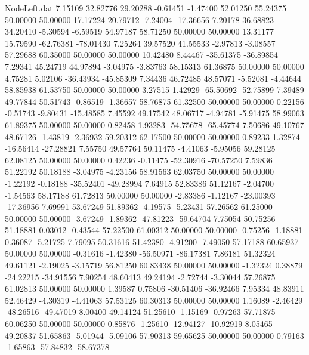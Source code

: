 \begin{filecontents}{NodeLeft.dat}
   7.15109   32.82776   29.20288    -0.61451   -1.47400   52.01250   55.24375   50.00000   50.00000   17.17224   20.79712   -7.24004  -17.36656
   7.20178   36.68823   34.20410    -5.30594   -6.59519   54.97187   58.71250   50.00000   50.00000   13.31177   15.79590  -62.76381  -78.01430
   7.25264   39.57520   41.55533    -2.97813   -3.08557   57.29688   60.35000   50.00000   50.00000   10.42480    8.44467  -35.61375  -36.89854
   7.29341   45.24719   44.97894    -3.04975   -3.83763   58.15313   61.36875   50.00000   50.00000    4.75281    5.02106  -36.43934  -45.85309
   7.34436   46.72485   48.57071    -5.52081   -4.44644   58.85938   61.53750   50.00000   50.00000    3.27515    1.42929  -65.50692  -52.75899
   7.39489   49.77844   50.51743    -0.86519   -1.36657   58.76875   61.32500   50.00000   50.00000    0.22156   -0.51743   -9.80431  -15.48585
   7.45592   49.17542   48.06717    -4.94781   -5.91475   58.99063   61.89375   50.00000   50.00000    0.82458    1.93283  -54.75678  -65.45774
   7.50686   49.10767   48.67126    -1.43819   -2.36932   59.20312   62.17500   50.00000   50.00000    0.89233    1.32874  -16.56414  -27.28821
   7.55750   49.57764   50.11475    -4.41063   -5.95056   59.28125   62.08125   50.00000   50.00000    0.42236   -0.11475  -52.30916  -70.57250
   7.59836   51.22192   50.18188    -3.04975   -4.23156   58.91563   62.03750   50.00000   50.00000   -1.22192   -0.18188  -35.52401  -49.28994
   7.64915   52.83386   51.12167    -2.04700   -1.54563   58.17188   61.72813   50.00000   50.00000   -2.83386   -1.12167  -23.00393  -17.36956
   7.69991   53.67249   51.89362    -4.19575   -5.23431   57.26562   61.25000   50.00000   50.00000   -3.67249   -1.89362  -47.81223  -59.64704
   7.75054   50.75256   51.18881     0.03012   -0.43544   57.22500   61.00312   50.00000   50.00000   -0.75256   -1.18881    0.36087   -5.21725
   7.79095   50.31616   51.42380    -4.91200   -7.49050   57.17188   60.65937   50.00000   50.00000   -0.31616   -1.42380  -56.50971  -86.17381
   7.86181   51.32324   49.61121    -2.19025   -3.15719   56.81250   60.83438   50.00000   50.00000   -1.32324    0.38879  -24.22215  -34.91556
   7.90254   48.60413   49.24194    -2.72744   -3.30044   57.26875   61.02813   50.00000   50.00000    1.39587    0.75806  -30.51406  -36.92466
   7.95334   48.83911   52.46429    -4.30319   -4.41063   57.53125   60.30313   50.00000   50.00000    1.16089   -2.46429  -48.26516  -49.47019
   8.00400   49.14124   51.25610    -1.15169   -0.97263   57.71875   60.06250   50.00000   50.00000    0.85876   -1.25610  -12.94127  -10.92919
   8.05465   49.20837   51.65863    -5.01944   -5.09106   57.90313   59.65625   50.00000   50.00000    0.79163   -1.65863  -57.84832  -58.67378

\end{filecontents}
